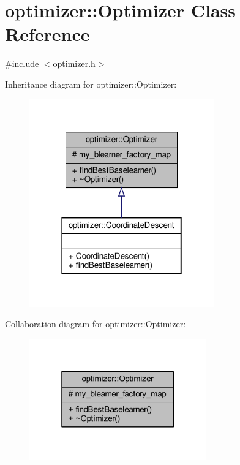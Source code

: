 \hypertarget{classoptimizer_1_1_optimizer}{}\section{optimizer\+:\+:Optimizer Class Reference}
\label{classoptimizer_1_1_optimizer}


{\ttfamily \#include $<$optimizer.\+h$>$}



Inheritance diagram for optimizer\+:\+:Optimizer\+:
\nopagebreak
\begin{figure}[H]
\begin{center}
\leavevmode
\includegraphics[width=226pt]{classoptimizer_1_1_optimizer__inherit__graph}
\end{center}
\end{figure}


Collaboration diagram for optimizer\+:\+:Optimizer\+:\nopagebreak
\begin{figure}[H]
\begin{center}
\leavevmode
\includegraphics[width=217pt]{classoptimizer_1_1_optimizer__coll__graph}
\end{center}
\end{figure}
